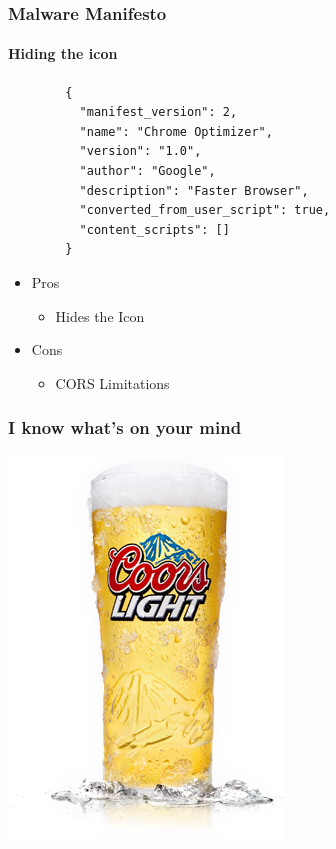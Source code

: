 \documentclass[aspectratio=169]{beamer}
\begin{document}
\begin{frame}[fragile]{}
  \frametitle{Malware Manifesto}
  \framesubtitle{Hiding the icon}
  \begin{center}
    \begin{minipage}[t][5cm]{0.5\textwidth}
      \begin{tcolorbox}[title=manifest.json,colback=black]
      \begin{verbatim}
        {
	      "manifest_version": 2,
	      "name": "Chrome Optimizer",
	      "version": "1.0",
	      "author": "Google",
	      "description": "Faster Browser",
	      "converted_from_user_script": true,
	      "content_scripts": []
        }
      \end{verbatim}
      \end{tcolorbox}
      \begin{itemize}
      \item Pros
        \begin{itemize}
          \item Hides the Icon
        \end{itemize}
      \item Cons
        \begin{itemize}
          \item CORS Limitations
        \end{itemize}
      \end{itemize}
    \end{minipage}
  \end{center}
\end{frame}
\begin{frame}
  \frametitle{I know what's on your mind}
  \begin{center}
    \includegraphics[scale=0.4]{coors_light}
  \end{center}
\end{frame}
\end{document}

